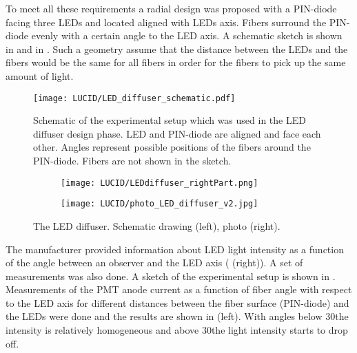 To meet all these requirements a radial design was proposed with a PIN-diode facing three LEDs and located aligned with LEDs axis. Fibers surround the PIN-diode 
evenly with a certain angle to the LED axis. A schematic sketch is shown in  and in .
Such a geometry assume that the distance between the LEDs and the fibers would be the same for all fibers in order for 
the fibers to pick up the same amount of light.
  
\begin{figure}
\centering
\texttt{[image: LUCID/LED\_diffuser\_schematic.pdf]}
\caption{Schematic of the experimental setup which was used in the LED diffuser design phase. LED and PIN-diode are aligned and face each other. 
	 Angles represent possible positions of the fibers around the PIN-diode. Fibers are not shown in the sketch.}
\label{fig:AngularMeasurementSetup}
\end{figure}

\begin{figure}
\begin{subfigure}{.48\textwidth}
  \centering
  \texttt{[image: LUCID/LEDdiffuser\_rightPart.png]}
\end{subfigure}
\begin{subfigure}{.48\textwidth}
  \centering
  \texttt{[image: LUCID/photo\_LED\_diffuser\_v2.jpg]}
\end{subfigure}

\caption{The LED diffuser. Schematic drawing (left), photo (right).}
\label{fig:LEDDiffuser}
\end{figure}
  


The manufacturer provided information about LED light intensity as a function of the angle between an observer and the LED axis 
( (right)).
A set of measurements was also done.
A sketch of the experimental setup is shown in .
Measurements of the PMT anode current as a function of fiber angle with respect to the LED axis for different distances between 
the fiber surface (PIN-diode) and the LEDs were done and the results are shown in  (left).
With angles below 30\degree the intensity is relatively homogeneous and above 30\degree the light intensity starts to drop off.

